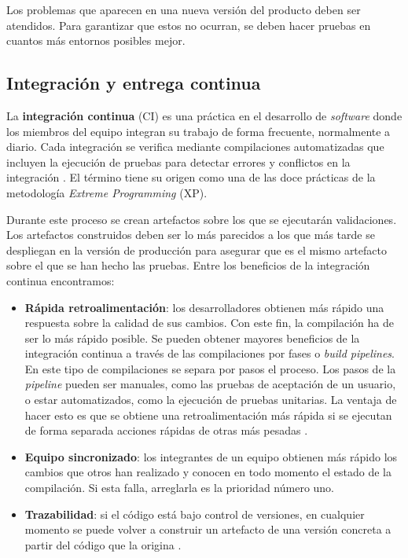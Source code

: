 \documentclass[11pt,spanish,listoffigures]{tfgetsinf}
\begin{document}
Los problemas que aparecen en una nueva versión del producto deben ser atendidos. Para garantizar que estos no ocurran, se deben hacer pruebas en cuantos más entornos posibles mejor.

\subsection{Integración y entrega continua}

La \textbf{integración continua} (CI) es una práctica en el desarrollo de \textit{software} donde los miembros del equipo integran su trabajo de forma frecuente, normalmente a diario. Cada integración se verifica mediante compilaciones automatizadas que incluyen la ejecución de pruebas para detectar errores y conflictos en la integración \cite{Fowler2006}. El término tiene su origen como una de las doce prácticas de la metodología \textit{Extreme Programming} (XP).

Durante este proceso se crean artefactos sobre los que se ejecutarán validaciones. Los artefactos construidos deben ser lo más parecidos a los que más tarde se despliegan en la versión de producción para asegurar que es el mismo artefacto sobre el que se han hecho las pruebas. Entre los beneficios de la integración continua encontramos:
 
\begin{itemize}

\item \textbf{Rápida retroalimentación}: los desarrolladores obtienen más rápido una respuesta sobre la calidad de sus cambios. Con este fin, la compilación ha de ser lo más rápido posible. Se pueden obtener mayores beneficios de la integración continua a través de las compilaciones por fases o \textit{build pipelines}. En este tipo de compilaciones se separa por pasos el proceso. Los pasos de la \textit{pipeline} pueden ser manuales, como las pruebas de aceptación de un usuario, o estar automatizados, como la ejecución de pruebas unitarias. La ventaja de hacer esto es que se obtiene una retroalimentación más rápida si se ejecutan de forma separada acciones rápidas de otras más pesadas \cite{Fowler2006}.

\item \textbf{Equipo sincronizado}: los integrantes de un equipo obtienen más rápido los cambios que otros han realizado y conocen en todo momento el estado de la compilación. Si esta falla, arreglarla es la prioridad número uno.

\item \textbf{Trazabilidad}: si el código está bajo control de versiones, en cualquier momento se puede volver a construir un artefacto de una versión concreta a partir del código que la origina \cite{Newman2015a}.

\end{itemize}
\end{document}
